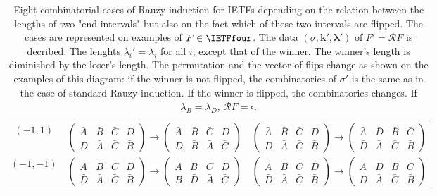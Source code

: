 \documentclass[12pt]{article}
\theoremstyle{definition}
\begin{document}
\begin{table}
\begin{tabular}{cc|c}
   \\[30pt]


$(-1, 1)$
& $\begin{pmatrix}
\bar{A}&\bar{B}&\bar{C}&D\\
D&\bar{A}&\bar{C}&\bar{B}
\end{pmatrix} 

\rightarrow
\begin{pmatrix}
\bar{A}&\bar{B}&\bar{C}&D\\
{D}&\bar{B}&\bar{A}&\bar{C}
\end{pmatrix}$     
    
    
     &    $\begin{pmatrix}
\bar{A}&\bar{B}&\bar{C}&D\\
D&\bar{A}&\bar{C}&\bar{B}
\end{pmatrix} 
 \rightarrow 
\begin{pmatrix}
\bar{A}&\bar{D}&\bar{B}&\bar{C}\\
\bar{D}&\bar{A}&\bar{C}&\bar{B}
\end{pmatrix}$  
 \\ [30pt]


{$(-1, -1)$
}& $\begin{pmatrix}
\bar{A}&\bar{B}&\bar{C}&\bar{D}\\
\bar{D}&\bar{A}&\bar{C}&\bar{B}
\end{pmatrix} 

\rightarrow
\begin{pmatrix}
\bar{A}&B&\bar{C}&\bar{D}\\
B&\bar{D}&\bar{A}&\bar{C}
\end{pmatrix}$     
    
  
     &  $\begin{pmatrix}
\bar{A}&\bar{B}&\bar{C}&\bar{D}\\
\bar{D}&\bar{A}&\bar{C}&\bar{B}
\end{pmatrix} 
 \rightarrow 
\begin{pmatrix}
\bar{A}&D&\bar{B}&\bar{C}\\
D&\bar{A}&\bar{C}&\bar{B}
\end{pmatrix}$  


  \end{tabular}
  \caption{Eight combinatorial cases of Rauzy induction for IETFs depending on the relation between the lengths of two "end intervals" but also on the fact which of these two intervals are flipped. The cases are represented on examples of $F \in \IETFfour$. The data $(\sigma, \boldsymbol{k}', \boldsymbol{\lambda}')$ of $F'=\mathcal{R} F$ is decribed. The lenghts $\lambda_i'=\lambda_i$ for all $i$, except that of the winner. The winner's length is diminished by the loser's length. The permutation and the vector of flips change as shown on the examples of this diagram: if the winner is not flipped, the combinatorics of $\sigma'$ is the same as in the case of standard Rauzy induction. If the winner is flipped, the combinatorics changes. If $\lambda_B=\lambda_D$, $\mathcal{R}F=\square$.}\label{table:how_works}
\end{table}
\end{document}
